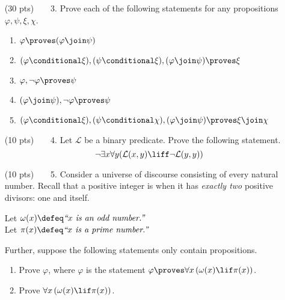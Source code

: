 \begin{enumerate}
\begin{enumerate}
    \end{enumerate}
  \item[(30 pts)~~~~3.]
    Prove each of the following statements for any propositions $\varphi, \psi, \xi, \chi$.
    \begin{enumerate}
      \item
        $\varphi \proves (\varphi \join \psi)$%
      \item
        $(\varphi \conditional \xi), (\psi \conditional \xi), (\varphi \join \psi) \proves \xi$%
      \item
        $\varphi, \neg \varphi \proves \psi$%
      \item
        $(\varphi \join \psi), \neg \varphi \proves \psi$%
      \item
          $(\varphi \conditional \xi), (\psi \conditional \chi), (\varphi \join \psi) \proves \xi \join \chi$%
    \end{enumerate}
  \item[(10 pts)~~~~4.]
    Let $\mathcal{L}$ be a binary predicate.
    Prove the following statement.%
    \begin{equation*}
      \neg \exists x \forall y (\mathcal{L}(x, y) \liff \neg \mathcal{L}(y, y))
    \end{equation*}
  \item[(10 pts)~~~~5.]
    Consider a universe of discourse consisting of every natural number.%
    Recall that a positive integer is  when it has \emph{exactly two} positive divisors: one and itself.

    Let $\omega(x) \defeq \emph{``}x\emph{ is an odd number.''}$ \\
    Let $\pi(x) \defeq \emph{``}x\emph{ is a prime number.''}$

    Further, suppose the following statements only contain propositions.
    \begin{enumerate}
      \item
        Prove $\varphi$, where $\varphi$ is the statement $\varphi \proves \forall x \left(\omega(x) \lif \pi(x)\right)$.
      \item
        Prove $\forall x \left(\omega(x) \lif \pi(x)\right)$.
  \end{enumerate}
\end{enumerate}


